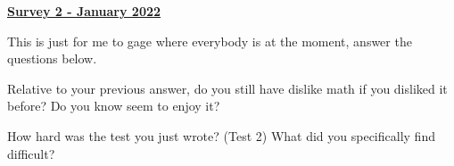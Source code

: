 \documentclass[12pt]{article} %
\begin{document}
	\renewcommand*{\coursecode}{MATH 235} %
	\renewcommand*{\assgnnumber}{Assignment 1} %
	\renewcommand*{\submdate}{September 14, 2021} %
	\renewcommand*{\studentfname}{Abdullah} %
	\renewcommand*{\studentlname}{Zubair} %
    \renewcommand*{\proofname}{Proof:}

	\renewcommand\qedsymbol{$\blacksquare$}
	\setfigpath
	\fancyhfoffset[L,O]{0pt} %




\begin{center}
	\textbf{\underline{\Huge{Survey 2 - January 2022}}}
\end{center}
This is just for me to gage where everybody is at the moment, answer the questions below. 

\begin{qstn}
  Relative to your previous answer, do you still have dislike math if you disliked it before? Do you know seem to
  enjoy it? 
\end{qstn}
\vspace*{2cm}

\begin{qstn}
  How hard was the test you just wrote? (Test 2) What did you specifically find difficult?
\end{qstn}
\vspace*{3cm}
\end{document}

